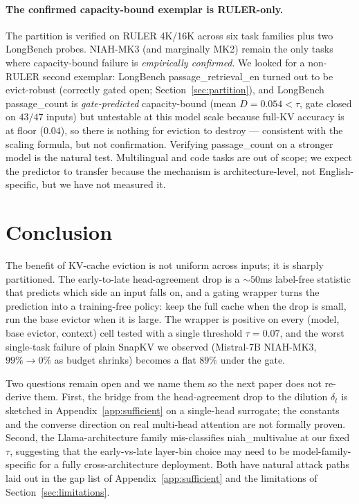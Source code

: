 \documentclass{article}
\begin{document}
\paragraph{The confirmed capacity-bound exemplar is RULER-only.} The
partition is verified on RULER 4K/16K across six task families plus two
LongBench probes. NIAH-MK3 (and marginally MK2) remain the only tasks
where capacity-bound failure is \emph{empirically confirmed}. We looked
for a non-RULER second exemplar: LongBench passage\_retrieval\_en turned
out to be evict-robust (correctly gated open;
Section~\ref{sec:partition}), and LongBench passage\_count is
\emph{gate-predicted} capacity-bound (mean $D = 0.054 < \tau$, gate
closed on $43/47$ inputs) but untestable at this model scale because
full-KV accuracy is at floor ($0.04$), so there is nothing for eviction
to destroy --- consistent with the scaling formula, but not
confirmation. Verifying passage\_count on a stronger model is the
natural test. Multilingual and code tasks are out of
scope; we expect the predictor to transfer because the mechanism is
architecture-level, not English-specific, but we have not measured it.

\section{Conclusion}
\label{sec:conclusion}

The benefit of KV-cache eviction is not uniform across inputs; it is
sharply partitioned. The early-to-late head-agreement drop is a
$\sim 50$ms label-free statistic that predicts which side an input
falls on, and a gating wrapper turns the prediction into a
training-free policy: keep the full cache when the drop is small, run
the base evictor when it is large. The wrapper is positive on every
(model, base evictor, context) cell tested with a single threshold
$\tau = 0.07$, and the worst single-task failure of plain SnapKV we
observed (Mistral-7B NIAH-MK3, $99\% \to 0\%$ as budget shrinks)
becomes a flat $89\%$ under the gate.

Two questions remain open and we name them so the next paper does not
re-derive them. First, the bridge from the head-agreement drop to
the dilution $\delta_t$ is sketched in Appendix~\ref{app:sufficient}
on a single-head surrogate; the constants and the converse direction
on real multi-head attention are not formally proven. Second, the
Llama-architecture family mis-classifies niah\_multivalue at our
fixed $\tau$, suggesting that the early-vs-late layer-bin choice may
need to be model-family-specific for a fully cross-architecture
deployment. Both have natural attack paths laid out in the gap list
of Appendix~\ref{app:sufficient} and the limitations of
Section~\ref{sec:limitations}.
\end{document}
